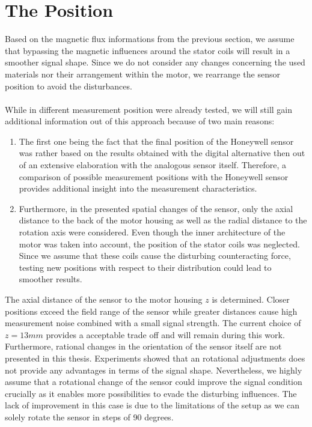 \documentclass[english]{isasthesis}
\begin{document}
    	\section{The Position} \label{position}
    	Based on the magnetic flux informations from the previous section, we assume that bypassing the magnetic influences around the stator coils will result in a smoother signal shape. Since we do not consider any changes concerning the used materials nor their arrangement within the motor, we rearrange the sensor position to avoid the disturbances. \\ \\
    	While in \citep{fabian} different measurement position were already tested, we will still gain additional information out of this approach because of two main reasons:
    	\begin{enumerate}
    		\item The first one being the fact that the final position of the Honeywell sensor was rather based on the results obtained with the digital alternative then out of an extensive elaboration with the analogous sensor itself. Therefore, a comparison of possible measurement positions with the Honeywell sensor provides additional insight into the measurement characteristics.
    		\item Furthermore, in the presented spatial changes of the sensor, only the axial distance to the back of the motor housing as well as the radial distance to the rotation axis were considered. Even though the inner architecture of the motor was taken into account, the position of the stator coils was neglected. Since we assume that these coils cause the disturbing counteracting force, testing new positions with respect to their distribution could lead to smoother results. 
    	\end{enumerate}
    	The axial distance of the sensor to the motor housing $z$ is determined. Closer positions exceed the field range of the sensor while greater distances cause high measurement noise combined with a small signal strength. The current choice of $z = 13mm$ provides a acceptable trade off and will remain during this work. Furthermore, rational changes in the orientation of the sensor itself are not presented in this thesis. Experiments showed that an rotational adjustments does not provide any advantages in terms of the signal shape. Nevertheless, we highly assume that a rotational change of the sensor could improve the signal condition crucially as it enables more possibilities to evade the disturbing influences. The lack of improvement in this case is due to the limitations of the setup as we can solely rotate the sensor in steps of 90 degrees.	
\end{document}
